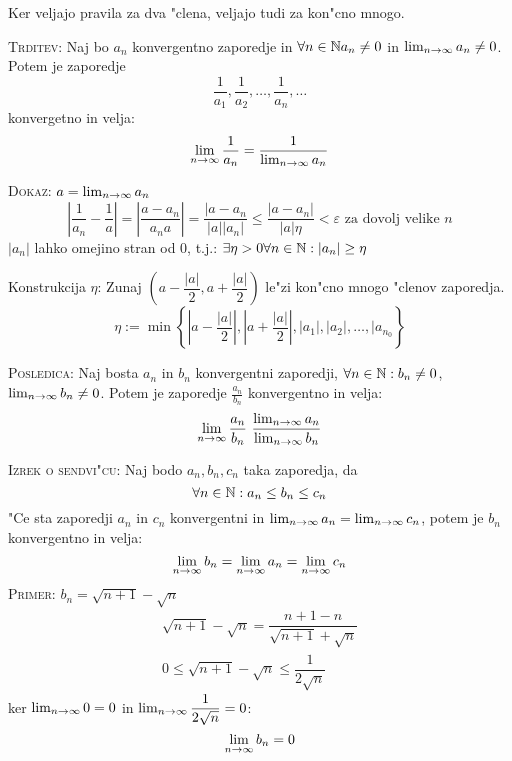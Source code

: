 Ker veljajo pravila za dva "clena, veljajo tudi za kon"cno mnogo.

\textsc{Trditev:} Naj bo $a_n$ konvergentno zaporedje in $\forall n \in \mathbb{N} a_n \neq 0$ in $\lim_{n \rightarrow \infty} a_n \neq 0$. Potem je zaporedje
\begin{equation*}
\dfrac{1}{a_1}, \dfrac{1}{a_2}, \ldots, \dfrac{1}{a_n}, \ldots
\end{equation*}
konvergetno in velja:
\begin{equation*}
\lim_{n \rightarrow \infty} \dfrac{1}{a_n} = \dfrac{1}{\lim_{n \rightarrow \infty} a_n}
\end{equation*}

\textsc{Dokaz:} $a = \lim_{n \rightarrow \infty} a_n$
\begin{equation*}
\left|\dfrac{1}{a_n} - \dfrac{1}{a}\right| = \left|\dfrac{a - a_n}{a_n a}\right| = \dfrac{|a - a_n}{|a||a_n|} \leq \dfrac{|a - a_n|}{|a| \eta} < \varepsilon \text{ za dovolj velike $n$}
\end{equation*}
$|a_n|$ lahko omejino stran od 0, t.j.: $\exists \eta > 0 \forall n \in \mathbb{N}: |a_n| \geq \eta$

Konstrukcija $\eta$: Zunaj $\left(a - \dfrac{|a|}{2}, a + \dfrac{|a|}{2}\right)$ le"zi kon"cno mnogo "clenov zaporedja.
\begin{equation*}
\eta := \min \left\{\left|a - \dfrac{|a|}{2}\right|, \left|a + \dfrac{|a|}{2}\right|, |a_1|, |a_2|, \ldots, |a_{n_0}  \right\}
\end{equation*}

\textsc{Posledica:} Naj bosta $a_n$ in $b_n$ konvergentni zaporedji, $\forall n \in \mathbb{N}: b_n \neq 0$, $\lim_{n \rightarrow \infty} b_n \neq 0$. Potem je zaporedje $\frac{a_n}{b_n}$ konvergentno in velja:
\begin{equation*}
\lim_{\toinf{n}}\dfrac{a_n}{b_n} \ \dfrac{\lim_{\toinf{n}} a_n}{\lim_{\toinf{n}}b_n}
\end{equation*}

\textsc{Izrek o sendvi"cu:} Naj bodo $a_n, b_n, c_n$ taka zaporedja, da 
\begin{equation*}
\forall n \in \mathbb{N}: a_n \leq b_n \leq c_n
\end{equation*}
"Ce sta zaporedji $a_n$ in $c_n$ konvergentni in $\lim_{n \rightarrow \infty} a_n = \lim_{n \rightarrow \infty}c_n$, potem je $b_n$ konvergentno in velja:
\begin{equation*}
\lim_{n \rightarrow \infty} b_n = \lim_{n \rightarrow \infty} a_n = \lim_{n \rightarrow \infty} c_n
\end{equation*}
\textsc{Primer:} $b_n = \sqrt{n+1} - \sqrt{n}$
\begin{gather*}
\sqrt{n+1} - \sqrt{n} = \dfrac{n+1 - n}{\sqrt{n+1} + \sqrt{n}}\\
0 \leq \sqrt{n+1} - \sqrt{n} \leq \dfrac{1}{2\sqrt{n}}
\end{gather*}
ker $\lim_{n \rightarrow \infty} 0 = 0$ in $\lim_{n \rightarrow \infty} \dfrac{1}{2\sqrt{n}} = 0$:
\begin{equation*}
\lim_{n \rightarrow \infty} b_n = 0
\end{equation*}